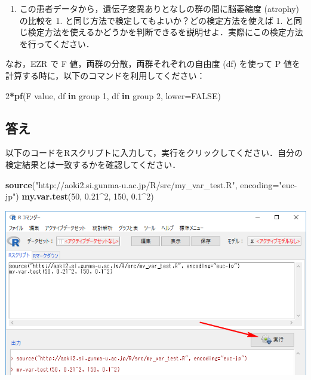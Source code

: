\documentclass[11pt,]{problemset}
\newenvironment{Shaded}{\begin{snugshade}}{\end{snugshade}}
\newcommand{\KeywordTok}[1]{\textcolor[rgb]{0.13,0.29,0.53}{\textbf{#1}}}
\newcommand{\DataTypeTok}[1]{\textcolor[rgb]{0.13,0.29,0.53}{#1}}
\newcommand{\DecValTok}[1]{\textcolor[rgb]{0.00,0.00,0.81}{#1}}
\newcommand{\FloatTok}[1]{\textcolor[rgb]{0.00,0.00,0.81}{#1}}
\newcommand{\StringTok}[1]{\textcolor[rgb]{0.31,0.60,0.02}{#1}}
\newcommand{\OtherTok}[1]{\textcolor[rgb]{0.56,0.35,0.01}{#1}}
\newcommand{\ControlFlowTok}[1]{\textcolor[rgb]{0.13,0.29,0.53}{\textbf{#1}}}
\newcommand{\OperatorTok}[1]{\textcolor[rgb]{0.81,0.36,0.00}{\textbf{#1}}}
\newcommand{\NormalTok}[1]{#1}
\providecommand{\tightlist}{%
  \setlength{\itemsep}{0pt}\setlength{\parskip}{0pt}}
\begin{document}
\bigskip

\newpage

\vfill

\begin{enumerate}
\def\labelenumi{\arabic{enumi}.}
\setcounter{enumi}{1}
\tightlist
\item
  この患者データから，遺伝子変異ありとなしの群の間に脳萎縮度 (atrophy)
  の比較を 1. と同じ方法で検定してもよいか？どの検定方法を使えば 1.
  と同じ検定方法を使えるかどうかを判断できるを説明せよ．実際にこの検定方法を行ってください．
\end{enumerate}

なお，EZR で F 値，両群の分散，両群それぞれの自由度 (df) を使って P
値を計算する時に，以下のコマンドを利用してください：

\begin{Shaded}
\begin{Highlighting}[]
\DecValTok{2}\OperatorTok{*}\KeywordTok{pf}\NormalTok{(F value, df }\ControlFlowTok{in}\NormalTok{ group }\DecValTok{1}\NormalTok{, df }\ControlFlowTok{in}\NormalTok{ group }\DecValTok{2}\NormalTok{, }\DataTypeTok{lower=}\OtherTok{FALSE}\NormalTok{)}
\end{Highlighting}
\end{Shaded}

\subsection{答え}\label{-1}

\bigskip
\newpage
\vfill
以下のコードをRスクリプトに入力して，実行をクリックしてください．自分の検定結果とは一致するかを確認してください．

\begin{Shaded}
\begin{Highlighting}[]
\KeywordTok{source}\NormalTok{(}\StringTok{"http://aoki2.si.gunma-u.ac.jp/R/src/my_var_test.R"}\NormalTok{, }\DataTypeTok{encoding=}\StringTok{"euc-jp"}\NormalTok{)}
\KeywordTok{my.var.test}\NormalTok{(}\DecValTok{50}\NormalTok{, }\FloatTok{0.21}\OperatorTok{^}\DecValTok{2}\NormalTok{, }\DecValTok{150}\NormalTok{, }\FloatTok{0.1}\OperatorTok{^}\DecValTok{2}\NormalTok{)}
\end{Highlighting}
\end{Shaded}

\bigskip\bigskip\bigskip\bigskip\bigskip

\begin{center}\includegraphics[width=0.9\linewidth]{pic/ftest01cut} \end{center}
\end{document}
